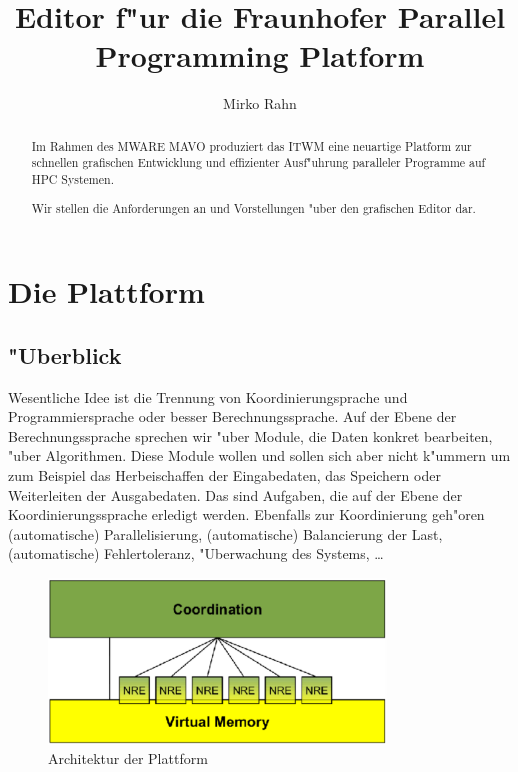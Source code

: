 \documentclass[a4paper,12pt]{article}
\begin{document}
\title{Editor f"ur die Fraunhofer Parallel Programming Platform}

\author{Mirko Rahn}

\maketitle

\begin{abstract}
  Im Rahmen des MWARE MAVO produziert das ITWM eine neuartige Platform
  zur schnellen grafischen Entwicklung und effizienter Ausf"uhrung
  paralleler Programme auf HPC Systemen.

  Wir stellen die Anforderungen an und Vorstellungen "uber den
  grafischen Editor dar.
\end{abstract}

\section{Die Plattform}
\subsection{"Uberblick}
Wesentliche Idee ist die Trennung von Koordinierungsprache und
Programmiersprache oder besser Berechnungssprache. Auf der Ebene der
Berechnungssprache sprechen wir "uber Module, die Daten konkret
bearbeiten, "uber Algorithmen. Diese Module wollen und sollen sich
aber nicht k"ummern um zum Beispiel das Herbeischaffen der
Eingabedaten, das Speichern oder Weiterleiten der Ausgabedaten. Das
sind Aufgaben, die auf der Ebene der Koordinierungssprache erledigt
werden. Ebenfalls zur Koordinierung geh"oren (automatische)
Parallelisierung, (automatische) Balancierung der Last, (automatische)
Fehlertoleranz, "Uberwachung des Systems, \ldots \cite{gelernter}

\begin{figure}\label{fig:arch}
\begin{center}
\includegraphics[width=0.8\textwidth]{architecture.pdf}
\end{center}
\caption{Architektur der Plattform}
\end{figure}
\end{document}
